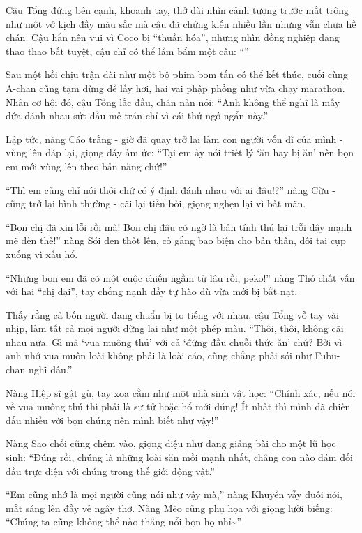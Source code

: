 \documentclass[../main.tex]{subfiles}
\begin{document}
Cậu Tổng đứng bên cạnh, khoanh tay, thở dài nhìn cảnh tượng trước mắt trông như một vở kịch đầy màu sắc mà cậu đã chứng kiến nhiều lần nhưng vẫn chưa hề chán. Cậu hẳn nên vui vì Coco bị ``thuần hóa'', nhưng nhìn đồng nghiệp đang thao thao bất tuyệt, cậu chỉ có thể lẩm bẩm một câu: ``''

Sau một hồi chịu trận dài như một bộ phim bom tấn có thể kết thúc, cuối cùng A-chan cũng tạm dừng để lấy hơi, hai vai phập phồng như vừa chạy marathon. Nhân cơ hội đó, cậu Tổng lắc đầu, chán nản nói: ``Anh không thể nghĩ là mấy đứa đánh nhau sứt đầu mẻ trán chỉ vì cái thứ ngớ ngẩn này.''

Lập tức, nàng Cáo trắng - giờ đã quay trở lại làm con người vốn dĩ của mình - vùng lên đáp lại, giọng đầy ấm ức: ``Tại em ấy nói triết lý `ăn hay bị ăn' nên bọn em mới vùng lên theo bản năng chứ!''

``Thì em cũng chỉ nói thôi chứ có ý định đánh nhau với ai đâu!?'' nàng Cừu - cũng trở lại bình thường - cãi lại tiền bối, giọng nghẹn lại vì bất mãn.

``Bọn chị đã xin lỗi rồi mà! Bọn chị đâu có ngờ là bản tính thú lại trỗi dậy mạnh mẽ đến thế!'' nàng Sói đen thốt lên, cố gắng bao biện cho bản thân, đôi tai cụp xuống vì xấu hổ.

``Nhưng bọn em đã có một cuộc chiến ngầm từ lâu rồi, peko!'' nàng Thỏ chất vấn với hai ``chị đại'', tay chống nạnh đầy tự hào dù vừa mới bị bắt nạt.

Thấy rằng cả bốn người đang chuẩn bị to tiếng với nhau, cậu Tổng vỗ tay vài nhịp, làm tất cả mọi người dừng lại như một phép màu. ``Thôi, thôi, không cãi nhau nữa. Gì mà `vua muông thú' với cả `đứng đầu chuỗi thức ăn' chứ? Bởi vì anh nhớ vua muôn loài không phải là loài cáo, cũng chẳng phải sói như Fubu-chan nghĩ đâu.''

Nàng Hiệp sĩ gật gù, tay xoa cằm như một nhà sinh vật học: ``Chính xác, nếu nói về vua muông thú thì phải là sư tử hoặc hổ mới đúng! Ít nhất thì mình đã chiến đấu nhiều với bọn chúng nên mình biết như vậy!''

Nàng Sao chổi cũng chêm vào, giọng điệu như đang giảng bài cho một lũ học sinh: ``Đúng rồi, chúng là những loài săn mồi mạnh nhất, chẳng con nào dám đối đầu trực diện với chúng trong thế giới động vật.''

``Em cũng nhớ là mọi người cũng nói như vậy mà,'' nàng Khuyển vẫy đuôi nói, mắt sáng lên đầy vẻ ngây thơ. Nàng Mèo cũng phụ họa với giọng lười biếng: ``Chúng ta cũng không thể nào thắng nổi bọn họ nhỉ\~{}''
\end{document}
